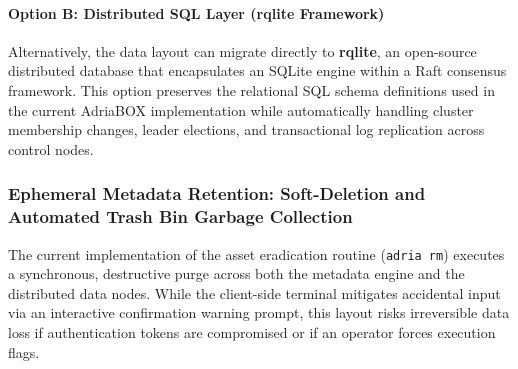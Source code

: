\paragraph{Option B: Distributed SQL Layer (rqlite Framework)}
Alternatively, the data layout can migrate directly to \textbf{rqlite}, an open-source distributed database that encapsulates an SQLite engine within a Raft consensus framework. This option preserves the relational SQL schema definitions used in the current AdriaBOX implementation while automatically handling cluster membership changes, leader elections, and transactional log replication across control nodes.

\subsubsection{Ephemeral Metadata Retention: Soft-Deletion and Automated Trash Bin Garbage Collection}
The current implementation of the asset eradication routine (\texttt{adria rm}) executes a synchronous, destructive purge across both the metadata engine and the distributed data nodes. While the client-side terminal mitigates accidental input via an interactive confirmation warning prompt, this layout risks irreversible data loss if authentication tokens are compromised or if an operator forces execution flags.

